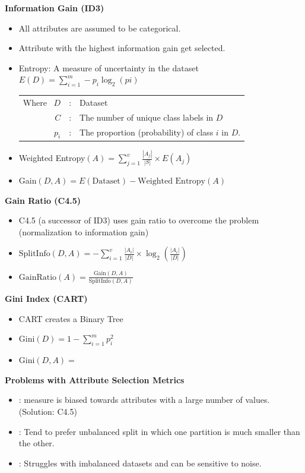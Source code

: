\begin{multicols}{2}
\textbf{Information Gain (ID3)}
\begin{itemize}[leftmargin=*,parsep=0.5em]
   \item All attributes are assumed to be categorical.
   \item Attribute with the highest information gain get selected.
   \item Entropy: A measure of uncertainty in the dataset\\
   $E(D) = \sum_{i=1}^{m} -p_i \log_2(pi)$\\
   \begin{tabularx}{\linewidth}{@{}r @{}P{2em}@{} X}
      Where \ $D$ &:& Dataset \\[-0.5em]
      $C$ &:& The number of unique class labels in $D$ \\[-0.5em]
      $p_i$&:& The proportion (probability) of class $i$ in $D$.
   \end{tabularx}
   \item Weighted Entropy$(A) = \sum_{j=1}^{v} \frac{|A_j|}{|S|} \times E(A_j)$
   \item Gain$(D,A) = E(\text{Dataset}) -  \text{Weighted Entropy}(A)$
\end{itemize}

\textbf{Gain Ratio (C4.5)}
\begin{itemize}[leftmargin=*,parsep=0.5em]
   \item C4.5 (a successor of ID3) uses gain ratio to overcome the
   problem (normalization to information gain)
   \item $\text{SplitInfo}(D,A) = -\sum_{i=1}^{v} \frac{|A_i|}{|D|} \times \log_2 \left(\frac{|A_i|}{|D|} \right)$
   \item $\text{GainRatio}(A) = \frac{\text{Gain}(D,A)}{\text{SplitInfo}(D,A)}$
\end{itemize}

\textbf{Gini Index (CART)}
\begin{itemize}[leftmargin=*,parsep=0.5em]
   \item CART creates a Binary Tree
   \item Gini$(D) = 1 - \sum_{i=1}^{m} p_i^2$
   \item Gini$(D,A) = $
\end{itemize}

\columnbreak
\textbf{Problems with Attribute Selection Metrics}
\begin{itemize}[leftmargin=*,parsep=0.5em]
   \item {}: measure is biased towards attributes with
   a large number of values. (Solution: C4.5)
   \item {}: Tend to prefer unbalanced split in which one partition is much smaller than the other.
   \item {}: Struggles with imbalanced datasets and can be sensitive to noise.
\end{itemize}
\end{multicols}